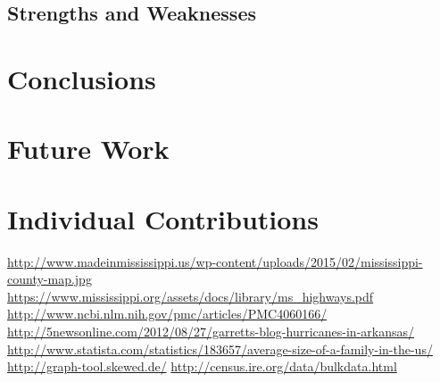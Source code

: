 \documentclass[titlepage]{article}
\begin{document}
  \subsection{Strengths and Weaknesses}

\section{Conclusions}
\label{sec:conclusions}

\section{Future Work}
\label{sec:future}

\section{Individual Contributions}
\label{sec:contributions}
  \begin{thebibliography}{9}
      \url{http://www.madeinmississippi.us/wp-content/uploads/2015/02/mississippi-county-map.jpg}
      \url{https://www.mississippi.org/assets/docs/library/ms_highways.pdf}
      \url{http://www.ncbi.nlm.nih.gov/pmc/articles/PMC4060166/}
      \url{http://5newsonline.com/2012/08/27/garretts-blog-hurricanes-in-arkansas/}
      \url{http://www.statista.com/statistics/183657/average-size-of-a-family-in-the-us/}
      \url{http://graph-tool.skewed.de/}
      \url{http://census.ire.org/data/bulkdata.html}
  \end{thebibliography}






















\end{document}
